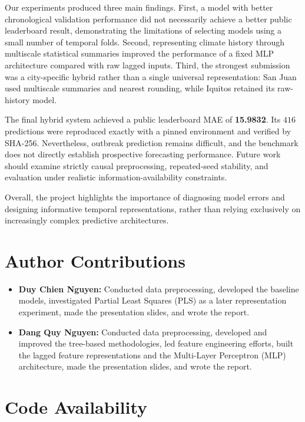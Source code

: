 \documentclass[11pt,a4paper]{article}
\begin{document}
Our experiments produced three main findings. First, a model with better chronological validation performance did not necessarily achieve a better public leaderboard result, demonstrating the limitations of selecting models using a small number of temporal folds. Second, representing climate history through multiscale statistical summaries improved the performance of a fixed MLP architecture compared with raw lagged inputs. Third, the strongest submission was a city-specific hybrid rather than a single universal representation: San Juan used multiscale summaries and nearest rounding, while Iquitos retained its raw-history model.

The final hybrid system achieved a public leaderboard MAE of \textbf{15.9832}. Its $416$ predictions were reproduced exactly with a pinned environment and verified by SHA-256. Nevertheless, outbreak prediction remains difficult, and the benchmark does not directly establish prospective forecasting performance. Future work should examine strictly causal preprocessing, repeated-seed stability, and evaluation under realistic information-availability constraints.

Overall, the project highlights the importance of diagnosing model errors and designing informative temporal representations, rather than relying exclusively on increasingly complex predictive architectures.
\section*{Author Contributions}
\begin{itemize}
  \item \textbf{Duy Chien Nguyen:} Conducted data preprocessing, developed the baseline models, investigated Partial Least Squares (PLS) as a later representation experiment, made the presentation slides, and wrote the report.
  \item \textbf{Dang Quy Nguyen:} Conducted data preprocessing, developed and improved the tree-based methodologies, led feature engineering efforts, built the lagged feature representations and the Multi-Layer Perceptron (MLP) architecture,  made the presentation slides, and wrote the report.
\end{itemize}

\section*{Code Availability}
\end{document}
